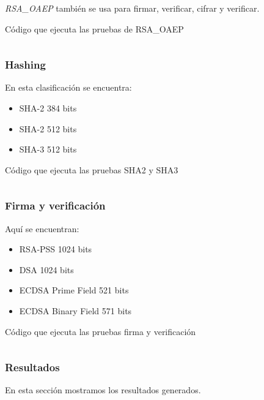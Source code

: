 \documentclass[../main.tex]{subfiles}
\begin{document}
\textit{RSA\_OAEP} también se usa para firmar, verificar, cifrar y verificar.
\begin{code}
  \caption{Código que ejecuta las pruebas de RSA\_OAEP}\label{sec:cifrado-y-descifrado-2}
  \inputminted[lastline=65]{python}{../src/test_algoritmos_crypto/RSAOAEPTest.py}
\end{code}

\subsubsection{Hashing}\label{hashing}
En esta clasificación se encuentra:
\begin{itemize}
  \item SHA-2 384 bits
  \item SHA-2 512 bits
  \item SHA-3 512 bits
\end{itemize}
\begin{code}
  \caption{Código que ejecuta las pruebas SHA2 y SHA3}\label{sec:hashing}
  \inputminted[lastline=56]{python}{../src/test_algoritmos_crypto/SHATests.py}
\end{code}

\subsubsection{Firma y verificación}\label{firma-y-verificacion}
Aquí se encuentran:
\begin{itemize}
  \item RSA-PSS 1024 bits
  \item DSA 1024 bits
  \item ECDSA Prime Field 521 bits
  \item ECDSA Binary Field 571 bits
\end{itemize}
\begin{code}
  \caption{Código que ejecuta las pruebas firma y verificación}\label{sec:firma-y-verificacion-1}
  \inputminted[lastline=149]{python}{../src/test_algoritmos_crypto/SignVerifTests.py}
\end{code}

\newpage{}

\subsubsection{Resultados}\label{sec:resultados}

En esta sección mostramos los resultados generados.
\end{document}
